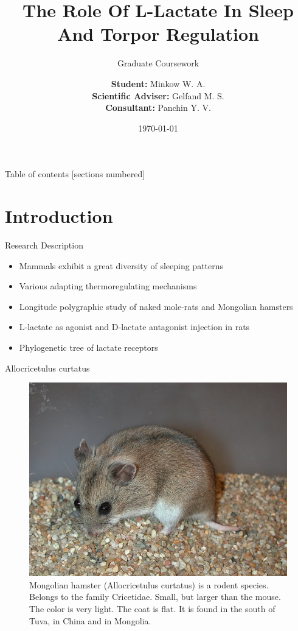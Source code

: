 \documentclass[10pt]{beamer}
\title{The Role Of L-Lactate In Sleep And Torpor Regulation}
\subtitle{Graduate Coursework}
\date{\today}
\author{\textbf{Student:} Minkow W. A. \\ \textbf{Scientific Adviser:} Gelfand M. S. \\ \textbf{Consultant:} Panchin Y. V.}
\institute{National Research University – Higher School of Economics \\ Faculty of Computer Sciences}
\begin{document}
\maketitle

\begin{frame}{Table of contents}
  [sections numbered]
  \tableofcontents[hideallsubsections]
\end{frame}





\section{Introduction}

\begin{frame}[fragile]{Research Description}

\begin{itemize}
  \item Mammals exhibit a great diversity of sleeping patterns
  \item Various adapting thermoregulating mechanisms
  \item Longitude polygraphic study of naked mole-rats and Mongolian hamsters
  \item L-lactate as agonist and D-lactate antagonist injection in rats
  \item Phylogenetic tree of lactate receptors 
\end{itemize}

\end{frame}


\begin{frame}[fragile]{Allocricetulus curtatus}

\begin{figure}[H]
\centering
\includegraphics[width=0.7\linewidth]{curtatus.jpg}
\caption{Mongolian hamster (Allocricetulus curtatus) is a rodent species. Belongs to the family Cricetidae. Small, but larger than the mouse. The color is very light. The coat is flat. It is found in the south of Tuva, in China and in Mongolia.}\label{fig:curtatus}
\end{figure}

\end{frame}
\end{document}
